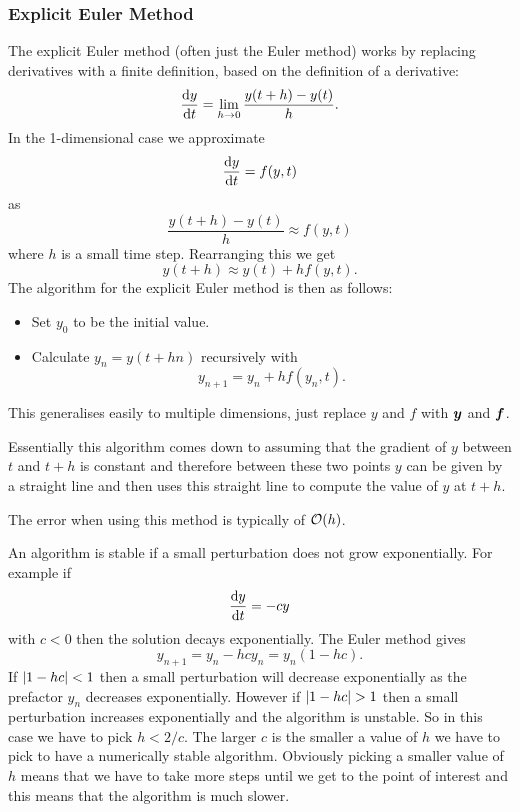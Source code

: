 \documentclass[a4paper]{article}
\begin{document}
    \subsubsection{Explicit Euler Method}
    The explicit Euler method (often just the Euler method) works by replacing derivatives with a finite definition, based on the definition of a derivative:
    \[\dv{y}{t} = \lim_{h\to 0} \frac{y(t + h) - y(t)}{h}.\]
    In the 1-dimensional case we approximate
    \[\dv{y}{t} = f(y, t)\]
    as
    \[\frac{y(t + h) - y(t)}{h} \approx f(y, t)\]
    where \(h\) is a small time step.
    Rearranging this we get
    \[y(t + h) \approx y(t) + hf(y, t).\]
    The algorithm for the explicit Euler method is then as follows:
    \begin{itemize}
        \item Set \(y_0\) to be the initial value.
        \item Calculate \(y_n = y(t + hn)\) recursively with
        \[y_{n+1} = y_n + hf(y_n, t).\]
    \end{itemize}
    This generalises easily to multiple dimensions, just replace \(y\) and \(f\) with \(\bm{y}\) and \(\bm{f}\).
    
    Essentially this algorithm comes down to assuming that the gradient of \(y\) between \(t\) and \(t + h\) is constant and therefore between these two points \(y\) can be given by a straight line and then uses this straight line to compute the value of \(y\) at \(t + h\).
    
    The error when using this method is typically of \(\order{h}\).
    
    An algorithm is stable if a small perturbation does not grow exponentially.
    For example if
    \[\dv{y}{t} = -cy\]
    with \(c < 0\) then the solution decays exponentially.
    The Euler method gives
    \[y_{n+1} = y_n - hcy_n = y_n(1 - hc).\]
    If \(\abs{1 - hc} < 1\) then a small perturbation will decrease exponentially as the prefactor \(y_n\) decreases exponentially.
    However if \(\abs{1 - hc} > 1\)  then a small perturbation increases exponentially and the algorithm is unstable.
    So in this case we have to pick \(h < 2/c\).
    The larger \(c\) is the smaller a value of \(h\) we have to pick to have a numerically stable algorithm.
    Obviously picking a smaller value of \(h\) means that we have to take more steps until we get to the point of interest and this means that the algorithm is much slower.
    
\end{document}
